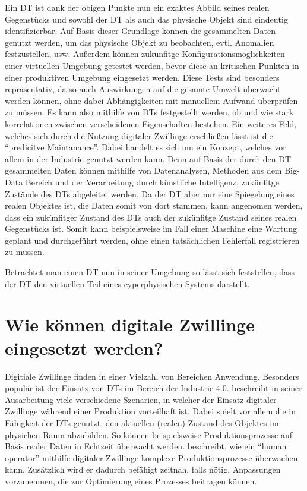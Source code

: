 Ein \ac{DT} ist dank der obigen Punkte nun ein exaktes Abbild seines realen Gegenstücks und sowohl der \ac{DT} als auch das physische Objekt sind eindeutig identifizierbar. Auf Basis dieser Grundlage können die gesammelten Daten genutzt werden, um das physische Objekt zu beobachten, evtl. Anomalien festzustellen, usw. Außerdem können zukünfitge Konfigurationsmöglichkeiten einer virtuellen Umgebung getestet werden, bevor diese an kritischen Punkten in einer produktiven Umgebung eingesetzt werden.\autocites{barricelli2019survey} Diese Tests sind besonders repräsentativ, da so auch Auswirkungen auf die gesamte Umwelt überwacht werden können, ohne dabei Abhängigkeiten mit manuellem Aufwand überprüfen zu müssen. Es kann also mithilfe von \ac{DT}s festgestellt werden, ob und wie stark korrelationen zwischen verscheidenen Eigenschaften bestehen. Ein weiteres Feld, welches sich durch die Nutzung digitaler Zwillinge erschließen lässt ist die \enquote{predicitve Maintanance}. Dabei handelt es sich um ein Konzept, welches vor allem in der Industrie genutzt werden kann. Denn auf Basis der durch den \ac{DT} gesammelten Daten können mithilfe von Datenanalysen, Methoden aus dem Big-Data Bereich und der Verarbeitung durch künstliche Intelligenz, zukünfitge Zustände des \ac{DT}s abgeleitet werden. Da der \ac{DT} aber nur eine Spiegelung eines realen Objektes ist, die Daten somit von dort stammen, kann angenomen werden, dass ein zukünfitger Zustand des \ac{DT}s auch der zukünfitge Zustand seines realen Gegenstücks ist. Somit kann beispielsweise im Fall einer Maschine eine Wartung geplant und durchgeführt werden, ohne einen tatsächlichen Fehlerfall registrieren zu müssen.

Betrachtet man einen \ac{DT} nun in seiner Umgebung so lässt sich feststellen, dass der \ac{DT} den virtuellen Teil eines cyperphysischen Systems darstellt.

\section{Wie können digitale Zwillinge eingesetzt werden?}

Digitiale Zwillinge finden in einer Vielzahl von Bereichen Anwendung. Besonders populär ist der Einsatz von \ac{DT}s im Bereich der Industrie 4.0. \citeauthor{tao2018digital} beschreibt in seiner Ausarbeitung viele verschiedene Szenarien, in welcher der Einsatz digitaler Zwillinge während einer Produktion vorteilhaft ist. Dabei spielt vor allem die in Fähigkeit der \ac{DT}s genutzt, den aktuellen (realen) Zustand des Objektes im physichen Raum abzubilden. So können beispielsweise Produktionsprozesse auf Basis realer Daten in Echtzeit überwacht werden. \autocite{tao2018digital} \citeauthor{weyer2016future} beschreibt, wie ein \enquote{human operator} mithilfe digitaler Zwillinge komplexe Produktionsprozesse überwachen kann. Zusätzlich wird er dadurch befähigt zeitnah, falls nötig, Anpassungen vorzunehmen, die zur Optimierung eines Prozesses beitragen können.\autocite{weyer2016future}

